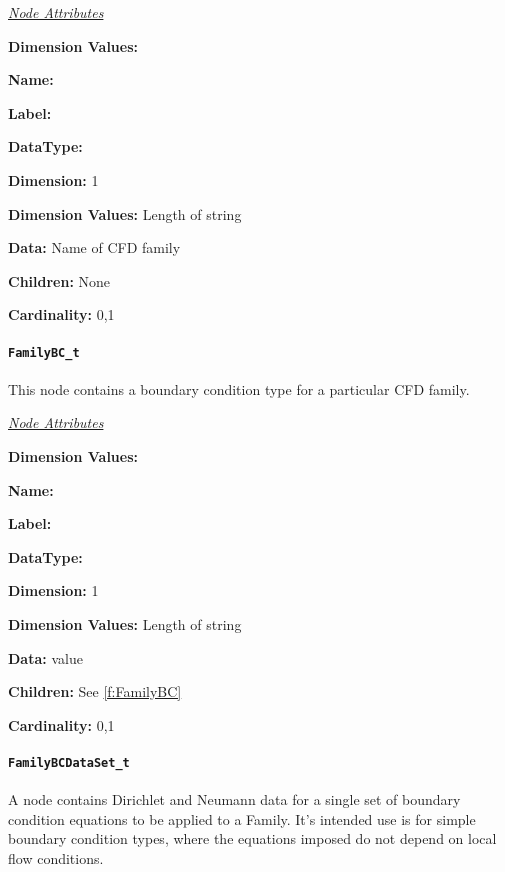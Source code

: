 \textit{\uline{Node Attributes}}
\begin{Ventryic}{\textbf{Dimension Values:}}
\item [\textbf{Name:}]
\item [\textbf{Label:}]
\item [\textbf{DataType:}]
\item [\textbf{Dimension:}]
      1
\item [\textbf{Dimension Values:}]
      Length of string
\item [\textbf{Data:}]
      Name of CFD family
\item [\textbf{Children:}]
      None
\item [\textbf{Cardinality:}]
      0,1
\end{Ventryic}

\paragraph{\texttt{FamilyBC\_t}}

This node contains a boundary condition type for a
particular CFD family.

\textit{\uline{Node Attributes}}
\begin{Ventryic}{\textbf{Dimension Values:}}
\item [\textbf{Name:}]
\item [\textbf{Label:}]
\item [\textbf{DataType:}]
\item [\textbf{Dimension:}]
      1
\item [\textbf{Dimension Values:}]
      Length of string
\item [\textbf{Data:}]
       value
\item [\textbf{Children:}]
      See \autoref{f:FamilyBC}
\item [\textbf{Cardinality:}]
      0,1
\end{Ventryic}

\paragraph{\texttt{FamilyBCDataSet\_t}}

A  node contains Dirichlet and Neumann
data for a single set of boundary condition equations to be applied
to a Family. It's intended use is for simple boundary condition types,
where the equations imposed do not depend on local flow conditions.

